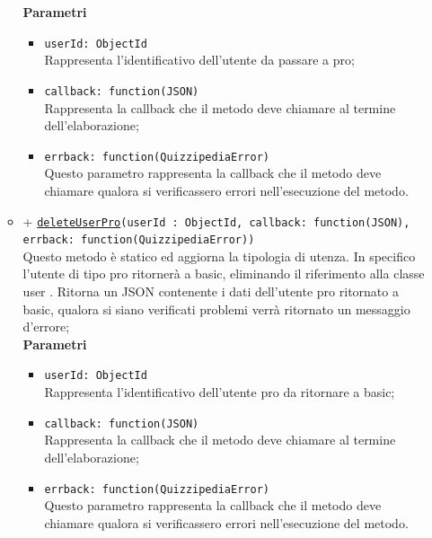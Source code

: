 \begin{itemize}
\begin{itemize}
		\textbf{Parametri} 
			\begin{itemize}
			\item
				\texttt{userId: ObjectId} \\
				Rappresenta l'identificativo dell'utente da passare a pro;
			\item	
				\texttt{callback: function(JSON)} \\
				Rappresenta la callback che il metodo deve chiamare al termine dell'elaborazione;	
			\item	
				\texttt{errback: function(QuizzipediaError)} \\
				Questo parametro rappresenta la callback che il metodo deve chiamare qualora si verificassero errori nell'esecuzione del metodo.		
			\end{itemize}	
		\item	
		+ \texttt{\underline{deleteUserPro}(userId : ObjectId, callback: function(JSON), errback: function(QuizzipediaError))} \\	
		Questo metodo è statico ed aggiorna la tipologia di utenza. In specifico l'utente di tipo pro ritornerà a basic, eliminando il riferimento alla classe user . Ritorna un JSON contenente i dati dell'utente pro ritornato a basic, qualora si siano verificati problemi verrà ritornato un messaggio d'errore;	\\	
		\textbf{Parametri} 
			\begin{itemize}
			\item
				\texttt{userId: ObjectId} \\
				Rappresenta l'identificativo dell'utente pro da ritornare a basic;
			\item	
				\texttt{callback: function(JSON)} \\
				Rappresenta la callback che il metodo deve chiamare al termine dell'elaborazione;	
			\item	
				\texttt{errback: function(QuizzipediaError)} \\
				Questo parametro rappresenta la callback che il metodo deve chiamare qualora si verificassero errori nell'esecuzione del metodo.		
			\end{itemize}		
		\end{itemize}
		
\end{itemize}
